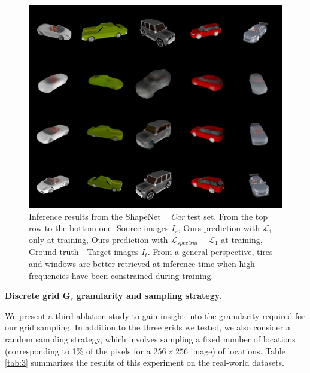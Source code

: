 \begin{figure}[h!]
    \begin{center}
    \includegraphics[width=\textwidth]{images/epipolarnvs/spectralCar.jpg}
    \end{center}
     \caption{Inference results from the ShapeNet ~\cite{chang2015shapenet} \textit{Car} test set. From the top row to the bottom one: Source images  $I_s$, Ours prediction with $\mathcal{L}_{1}$ only at training, Ours prediction with  $\mathcal{L}_{spectral} + \mathcal{L}_{1}$ at training, Ground truth - Target images $I_t$. From a general perspective, tires and windows are better retrieved at inference time when high frequencies have been constrained during training.}
     \label{fig:spectral_res}
\end{figure}

\textbf{Discrete grid $\textbf{G}_{r}$ granularity and sampling strategy.}

We present a third ablation study to gain insight into the granularity required for our grid sampling. In addition to the three grids we tested, we also consider a random sampling strategy, which involves sampling a fixed number of locations (corresponding to 1\% of the pixels for a $256\times 256$ image) of locations. Table \ref{tab:3} summarizes the results of this experiment on the real-world datasets.

